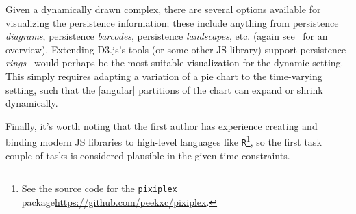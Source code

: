 \documentclass{vgtc}                          %
\begin{document}
Given a dynamically drawn complex, there are several options available for visualizing the persistence information; these include anything from persistence \emph{diagrams}, persistence \emph{barcodes}, persistence \emph{landscapes}, etc. (again see~\cite{chazal2021introduction} for an overview). Extending D3.js's tools (or some other JS library) support persistence \emph{rings}~\cite{rieck2012multivariate} would perhaps be the most suitable visualization for the dynamic setting. This simply requires adapting a variation of a pie chart to the time-varying setting, such that the [angular] partitions of the chart can expand or shrink dynamically. 

Finally, it's worth noting that the first author has experience creating and binding modern JS libraries to high-level languages like \texttt{R}\footnote{See the source code for the \texttt{pixiplex} package\url{https://github.com/peekxc/pixiplex}.}, so the first task couple of tasks is considered plausible in the given time constraints. 



\end{document}
